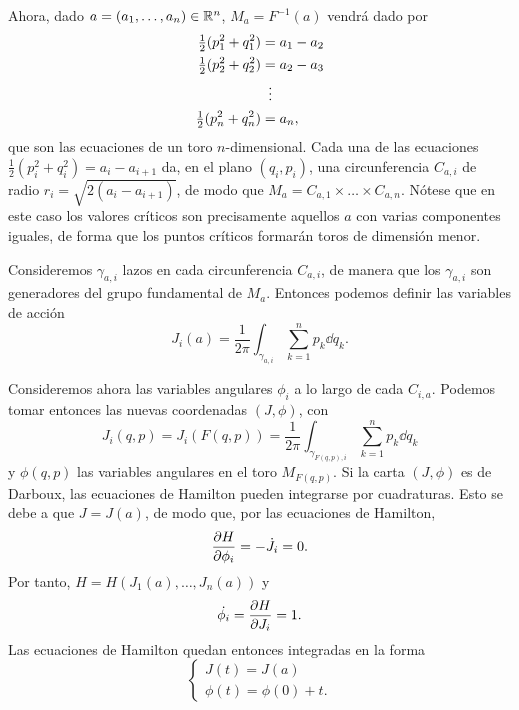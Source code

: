   Ahora, dado $a=(a_1,\dots,a_n)\in \mathbb{R}^n$, $M_a=F^{-1}(a)$ vendrá dado por 
  \begin{align*}[left=\empheqlbrace]
      \tfrac{1}{2}(p_1^2+q_1^2)&=a_1-a_2 \\
      \tfrac{1}{2}(p_2^2+q_2^2)&=a_2-a_3 \\
      & \vdotswithin{=} \\
\tfrac{1}{2}(p_n^2+q_n^2)&=a_n, 
  \end{align*}
  que son las ecuaciones de un toro $n$-dimensional. Cada una de las ecuaciones $\frac{1}{2}(p_i^2+q_i^2)=a_i-a_{i+1}$ da, en el plano $(q_i,p_i)$, una circunferencia $C_{a,i}$ de radio $r_i=\sqrt{2(a_i-a_{i+1})}$, de modo que $M_a=C_{a,1}\times\dots\times C_{a,n}$. Nótese que en este caso los valores críticos son precisamente aquellos $a$ con varias componentes iguales, de forma que los puntos críticos formarán toros de dimensión menor.

  Consideremos $\gamma_{a,i}$ lazos en cada circunferencia $C_{a,i}$, de manera que los $\gamma_{a,i}$ son generadores del grupo fundamental de $M_a$. Entonces podemos definir las variables de acción 
  \begin{equation*}
    J_i(a) = \frac{1}{2\pi}\int_{\gamma_{a,i}} \sum_{k=1}^n p_k \dd q_k.
  \end{equation*}

  Consideremos ahora las variables angulares $\phi_i$ a lo largo de cada $C_{i,a}$. Podemos tomar entonces las nuevas coordenadas $(J,\phi)$, con
  \begin{equation*}
      J_i(q,p)=J_i(F(q,p))=\frac{1}{2\pi}\int_{\gamma_{F(q,p),i}} \sum_{k=1}^n p_k \dd q_k 
  \end{equation*}
  y $\phi(q,p)$ las variables angulares en el toro $M_{F(q,p)}$.
  Si la carta $(J,\phi)$ es de Darboux, las ecuaciones de Hamilton pueden integrarse por cuadraturas. Esto se debe a que $J=J(a)$, de modo que, por las ecuaciones de Hamilton,
\begin{equation*}
  \frac{\partial H}{\partial \phi_i}=-\dot{J_i}=0.
\end{equation*}
Por tanto, $H=H(J_1(a),\dots,J_n(a))$ y 
\begin{equation*}
  \dot{\phi_i}=\frac{\partial H}{\partial J_i} = 1.
\end{equation*}
 Las ecuaciones de Hamilton quedan entonces integradas en la forma
\begin{equation*}
  \begin{cases}
  J(t)=  J(a) \\
  \phi(t) =  \phi(0) + t.
\end{cases}
\end{equation*}

